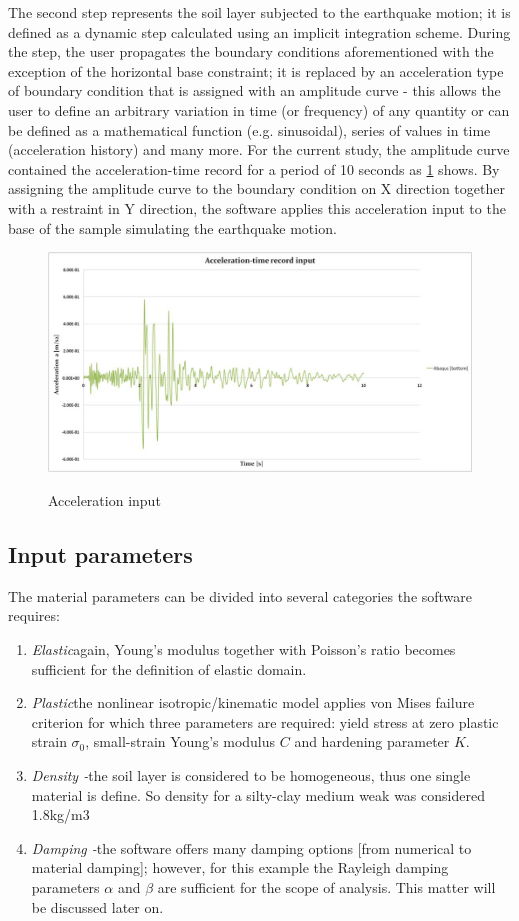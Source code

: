 \documentclass[10pt,a4paper]{report}
\begin{document}
The second step represents the soil layer subjected to the earthquake motion; it is defined as a dynamic step calculated using an implicit integration scheme. During the step, the user propagates the boundary conditions aforementioned with the exception of the horizontal base constraint; it is replaced by an acceleration type of boundary condition that is assigned with an amplitude curve - this allows the user to define an arbitrary variation in time (or frequency) of any quantity or can be defined as a mathematical function (e.g. sinusoidal), series of values in time (acceleration history) and many more. For the current study, the amplitude curve contained the acceleration-time record for a period of 10 seconds as \ref{Acceleration} shows. By assigning the amplitude curve to the boundary condition on X direction together with a restraint in Y direction, the software applies this acceleration input to the base of the sample simulating the earthquake motion.

\begin{figure}[h!]
	\centering
	\includegraphics[width=0.7\linewidth]{"Acc input"}
	\caption{Acceleration input}
	\caption{}
	\label{Acceleration}
\end{figure}


	\subsection{Input parameters}
The material parameters can be divided into several categories the software requires:
\begin{enumerate}
	\item \textit{Elastic}\quad again, Young's modulus together with Poisson's ratio becomes sufficient for the definition of elastic domain.
	\item \textit{Plastic}\quad the nonlinear isotropic/kinematic model applies von Mises failure criterion for which three parameters are required: yield stress at zero plastic strain $\sigma_0$, small-strain Young's modulus $C$ and hardening parameter $K$.
	\item\textit{Density -}\quad the soil layer is considered to be homogeneous, thus one single material is define. So density for a silty-clay medium weak was considered 1.8kg/m3
	\item \textit{Damping -}\quad the software offers many damping options [from numerical to material damping]; however, for this example the Rayleigh damping parameters $\alpha$ and $\beta$ are sufficient for the scope of analysis. This matter will be discussed later on.
\end{enumerate}
\end{document}
